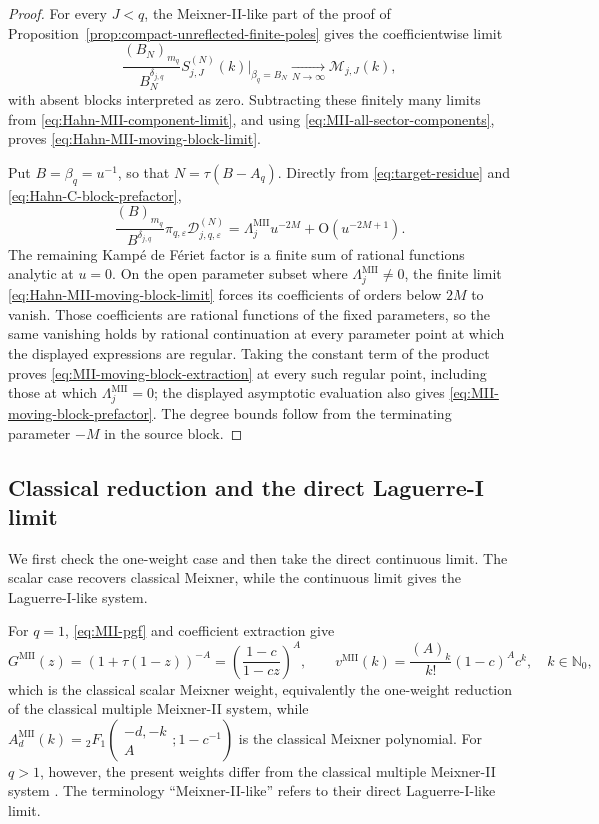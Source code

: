\documentclass[10pt]{amsart}
\newcommand{\Nzero}{\mathbb N_0}
\newcommand{\pFq}[5]{{}_{#1}F_{#2}\!\left(\begin{matrix}#3\\#4\end{matrix};#5\right)}
\theoremstyle{plain}
\theoremstyle{definition}
\theoremstyle{remark}
\begin{document}
\begin{proof}
For every \(J<q\), the Meixner-II-like part of the proof of
Proposition~\ref{prop:compact-unreflected-finite-poles} gives the
coefficientwise limit
\[
 \frac{(B_N)_{m_q}}{B_N^{\delta_{j,q}}}
 S_{j,J}^{(N)}(k)\big|_{\beta_q=B_N}
 \xrightarrow[N\to\infty]{}\mathscr M_{j,J}(k),
\]
with absent blocks interpreted as zero.  Subtracting these finitely many
limits from \eqref{eq:Hahn-MII-component-limit}, and using
\eqref{eq:MII-all-sector-components}, proves
\eqref{eq:Hahn-MII-moving-block-limit}.

Put \(B=\beta_q=u^{-1}\), so that
\(N=\tau(B-A_q)\).  Directly from
\eqref{eq:target-residue} and \eqref{eq:Hahn-C-block-prefactor},
\[
 \frac{(B)_{m_q}}{B^{\delta_{j,q}}}
 \pi_{q,\varepsilon}\mathcal D_{j,q,\varepsilon}^{(N)}
 =\Lambda_j^{\mathrm{MII}}u^{-2M}
  +\mathrm O(u^{-2M+1}).
\]
The remaining Kamp\'e de F\'eriet factor is a finite sum of rational
functions analytic at \(u=0\).  On the open parameter subset where
\(\Lambda_j^{\mathrm{MII}}\ne0\), the finite limit
\eqref{eq:Hahn-MII-moving-block-limit} forces its coefficients of orders
below \(2M\) to vanish. Those coefficients are rational functions of the
fixed parameters, so the same vanishing holds by rational continuation at
every parameter point at which the displayed expressions are regular.
Taking the constant term of the product proves
\eqref{eq:MII-moving-block-extraction} at every such regular point,
including those at which \(\Lambda_j^{\mathrm{MII}}=0\); the displayed
asymptotic evaluation also gives \eqref{eq:MII-moving-block-prefactor}.
The degree bounds follow
from the terminating parameter \(-M\) in the source block.
\end{proof}

\subsection{Classical reduction and the direct Laguerre-I limit}

We first check the one-weight case and then take the direct continuous
limit. The scalar case recovers classical Meixner, while the continuous
limit gives the Laguerre-I-like system.

For \(q=1\), \eqref{eq:MII-pgf} and coefficient extraction give
\[
 G^{\mathrm{MII}}(z)
 =(1+\tau(1-z))^{-A}
 =\left(\frac{1-c}{1-cz}\right)^A,
 \qquad
 v^{\mathrm{MII}}(k)=\frac{(A)_k}{k!}(1-c)^Ac^k,
 \quad k\in\Nzero,
\]
which is the classical scalar Meixner weight, equivalently the one-weight
reduction of the classical multiple Meixner-II system, while
\(A_d^{\mathrm{MII}}(k)=\pFq{2}{1}{-d,-k}{A}{1-c^{-1}}\) is the
classical Meixner polynomial. For \(q>1\), however, the present
weights differ from the classical multiple Meixner-II system
\cite{ArvesuCoussementVanAssche2003,
BranquinhoDiazFoulquieManasWolfs2024Discrete}.  The terminology
\enquote{Meixner-II-like} refers to their direct Laguerre-I-like limit.
\end{document}
